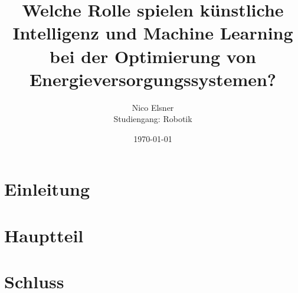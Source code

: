 \documentclass[
11pt, 
a4paper,
DIV = 14,
twoside,
twocolumn, %
parskip =half , %
headsepline, %
openright , %
]{scrreprt}
\begin{document}
	
	\title{Welche Rolle spielen künstliche Intelligenz und Machine Learning bei der Optimierung von Energieversorgungssystemen?}
	\author{Nico Elsner\\
		Studiengang: Robotik}
	\date{\today}
	\maketitle
	\tableofcontents
	\thispagestyle{empty}
	
	\section{Einleitung}
	\setcounter{page}{1}
	\blindtext
	\section{Hauptteil}
	\blindtext
	\section{Schluss}
	\blindtext
\end{document}
